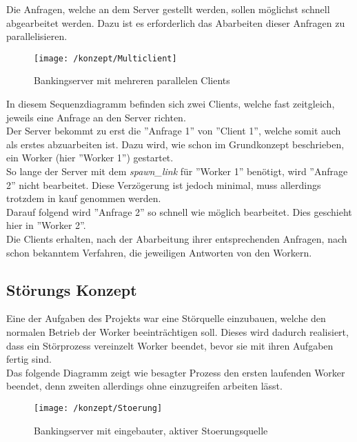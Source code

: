 Die Anfragen, welche an dem Server gestellt werden, sollen möglichst schnell abgearbeitet werden. Dazu ist es erforderlich das Abarbeiten dieser Anfragen zu parallelisieren.

\begin{figure}
\centering
\texttt{[image: /konzept/Multiclient]}
\caption{Bankingserver mit mehreren parallelen Clients}
\label{fig:multiclient}
\end{figure}

In diesem Sequenzdiagramm befinden sich zwei Clients, welche fast zeitgleich, jeweils eine Anfrage an den Server richten.\\
Der Server bekommt zu erst die ''Anfrage 1'' von ''Client 1'', welche somit auch als erstes abzuarbeiten ist. Dazu wird, wie schon im Grundkonzept beschrieben, ein Worker (hier ''Worker 1'') gestartet.\\
So lange der Server mit dem \textit{spawn\_link} für ''Worker 1'' benötigt, wird ''Anfrage 2'' nicht bearbeitet. Diese Verzögerung ist jedoch minimal, muss allerdings trotzdem in kauf genommen werden.\\
Darauf folgend wird ''Anfrage 2'' so schnell wie möglich bearbeitet. Dies geschieht hier in ''Worker 2''.\\
Die Clients erhalten, nach der Abarbeitung ihrer entsprechenden Anfragen, nach schon bekanntem Verfahren, die jeweiligen Antworten von den Workern.

\subsection{Störungs Konzept}

Eine der Aufgaben des Projekts war eine Störquelle einzubauen, welche den normalen Betrieb der Worker beeinträchtigen soll. Dieses wird dadurch realisiert, dass ein Störprozess vereinzelt Worker beendet, bevor sie mit ihren Aufgaben fertig sind.\\
Das folgende Diagramm zeigt wie besagter Prozess den ersten laufenden Worker beendet, denn zweiten allerdings ohne einzugreifen arbeiten lässt.\\

\begin{figure}
\centering
\texttt{[image: /konzept/Stoerung]}
\caption{Bankingserver mit eingebauter, aktiver Stoerungsquelle}
\label{fig:stoerung}
\end{figure}


